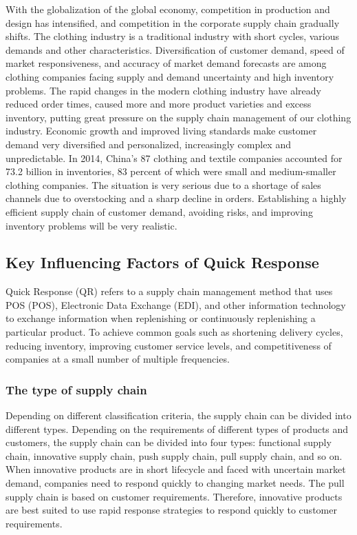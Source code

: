 \documentclass[12pt,]{article}
\begin{document}
With the globalization of the global economy, competition in production
and design has intensified, and competition in the corporate supply
chain gradually shifts. The clothing industry is a traditional industry
with short cycles, various demands and other characteristics.
Diversification of customer demand, speed of market responsiveness, and
accuracy of market demand forecasts are among clothing companies facing
supply and demand uncertainty and high inventory problems. The rapid
changes in the modern clothing industry have already reduced order
times, caused more and more product varieties and excess inventory,
putting great pressure on the supply chain management of our clothing
industry. Economic growth and improved living standards make customer
demand very diversified and personalized, increasingly complex and
unpredictable. In 2014, China's 87 clothing and textile companies
accounted for 73.2 billion in inventories, 83 percent of which were
small and medium-smaller clothing companies. The situation is very
serious due to a shortage of sales channels due to overstocking and a
sharp decline in orders. Establishing a highly efficient supply chain of
customer demand, avoiding risks, and improving inventory problems will
be very realistic.

\hypertarget{key-influencing-factors-of-quick-response}{%
\subsection{Key Influencing Factors of Quick
Response}\label{key-influencing-factors-of-quick-response}}

Quick Response (QR) refers to a supply chain management method that uses
POS (POS), Electronic Data Exchange (EDI), and other information
technology to exchange information when replenishing or continuously
replenishing a particular product. To achieve common goals such as
shortening delivery cycles, reducing inventory, improving customer
service levels, and competitiveness of companies at a small number of
multiple frequencies.

\hypertarget{the-type-of-supply-chain}{%
\subsubsection{The type of supply
chain}\label{the-type-of-supply-chain}}

Depending on different classification criteria, the supply chain can be
divided into different types. Depending on the requirements of different
types of products and customers, the supply chain can be divided into
four types: functional supply chain, innovative supply chain, push
supply chain, pull supply chain, and so on. When innovative products are
in short lifecycle and faced with uncertain market demand, companies
need to respond quickly to changing market needs. The pull supply chain
is based on customer requirements. Therefore, innovative products are
best suited to use rapid response strategies to respond quickly to
customer requirements.
\end{document}
